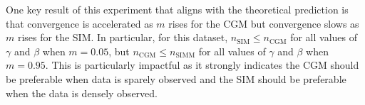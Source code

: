 One key result of this experiment that aligns with the theoretical prediction is that convergence is accelerated as $m$ rises for the CGM but convergence slows as $m$ rises for the SIM. In particular, for this dataset, $n_\text{SIM} \leq n_\text{CGM}$ for all values of $\gamma$ and $\beta$ when $m=0.05$, but $n_\text{CGM} \leq n_\text{SIMM}$ for all values of $\gamma$ and $\beta$ when $m=0.95$. This is particularly impactful as it strongly indicates the CGM should be preferable when data is sparely observed and the SIM should be preferable when the data is densely observed. 








